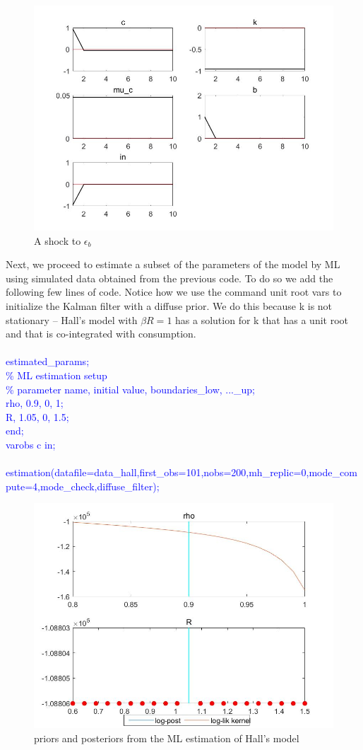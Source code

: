 \documentclass[a4paper,12pt]{scrartcl} %
\begin{document}
\begin{figure}[htbp!]
		\centering
			\includegraphics[width=0.8\linewidth]{fig23.jpg}
            \caption{A shock to $\epsilon_b$}\label{23}
\end{figure}

Next, we proceed to estimate a subset of the parameters of the model by ML using simulated data obtained from the previous code. To do so we add the following few lines of code. Notice how we use the command unit root vars to initialize the Kalman filter with a diffuse prior. We do this because k is not stationary – Hall’s model with $\beta R=1$ has a solution for k that has a unit root and that is co-integrated with consumption.\\
\\
\textcolor{blue}{
estimated\_params;\\
\% ML estimation setup\\
\% parameter name, initial value, boundaries\_low, ...\_up;\\
rho, 0.9, 0, 1;\\
R, 1.05, 0, 1.5;\\
end;\\
varobs c in;\\
\\
estimation(datafile=data\_hall,first\_obs=101,nobs=200,mh\_replic=0,mode\_compute=4,mode\_check,diffuse\_filter);}\\

\begin{figure}[htbp!]
		\centering
			\includegraphics[width=0.8\linewidth]{fig24.jpg}
            \caption{priors and posteriors from the ML estimation of Hall’s model}\label{24}
\end{figure}
\end{document}
